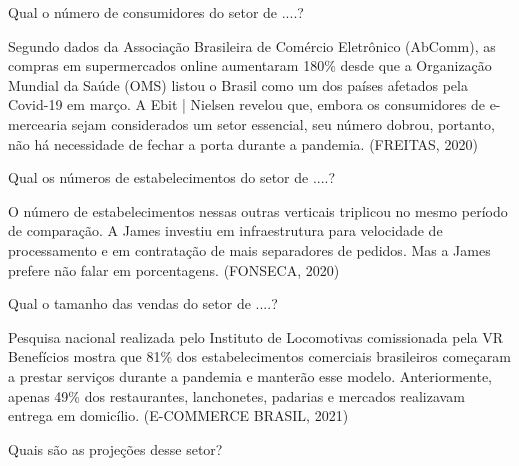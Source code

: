 \begin{commentA} \vspace{0.3cm} \noindent Qual o número de consumidores do setor de ....? \par \vspace{0.1cm} \end{commentA}

Segundo dados da Associação Brasileira de Comércio Eletrônico (AbComm), as compras em supermercados online aumentaram 180\% desde que a Organização Mundial da Saúde (OMS) listou o Brasil como um dos países afetados pela Covid-19 em março. A Ebit | Nielsen revelou que, embora os consumidores de e-mercearia sejam considerados um setor essencial, seu número dobrou, portanto, não há necessidade de fechar a porta durante a pandemia. (FREITAS, 2020)\par

\begin{commentA} \vspace{0.3cm} \noindent Qual os números de estabelecimentos do setor de ....? \par \vspace{0.1cm} \end{commentA}

O número de estabelecimentos nessas outras verticais triplicou no mesmo período de comparação. A James investiu em infraestrutura para velocidade de processamento e em contratação de mais separadores de pedidos. Mas a James prefere não falar em porcentagens. (FONSECA, 2020)\par

\begin{commentA} \vspace{0.3cm} \noindent Qual o tamanho das vendas do setor de ....? \par \vspace{0.1cm} \end{commentA}

Pesquisa nacional realizada pelo Instituto de Locomotivas comissionada pela VR Benefícios mostra que 81\% dos estabelecimentos comerciais brasileiros começaram a prestar serviços durante a pandemia e manterão esse modelo. Anteriormente, apenas 49\% dos restaurantes, lanchonetes, padarias e mercados realizavam entrega em domicílio. (E-COMMERCE BRASIL, 2021)

\begin{commentA} \vspace{0.3cm} \noindent Quais são as projeções desse setor? \par \vspace{0.1cm} \end{commentA}

